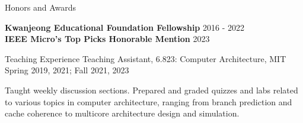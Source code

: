 \documentclass{resume} %
\begin{document}
\begin{rSection}{Honors and Awards}

{\bf Kwanjeong Educational Foundation Fellowship} \hfill {2016 - 2022} \\
\textbf{IEEE Micro's Top Picks Honorable Mention} \hfill {2023}

\end{rSection}


\begin{rSection}{Teaching Experience}
Teaching Assistant, 6.823: Computer Architecture, MIT \hfill {Spring 2019, 2021; Fall 2021, 2023}
\item Taught weekly discussion sections. Prepared and graded quizzes and labs related to 
    various topics in computer architecture, ranging from branch prediction and cache coherence
    to multicore architecture design and simulation.

\end{rSection}








\end{document}

